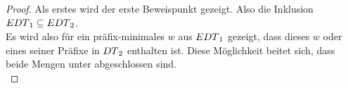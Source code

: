 \begin{proof}
  Als erstes wird der erste Beweispunkt gezeigt. Also die Inklusion
  $EDT{}_1\subseteq EDT{}_2$.\\
  Es wird also für ein präfix-minimales $w$ aus $EDT{}_1$ gezeigt, dass dieses
  $w$ oder eines seiner Präfixe in $DT{}_2$ enthalten ist. Diese Möglichkeit
  beitet sich, dass beide Mengen unter \cont{} abgeschlossen sind.\\


\end{proof}
